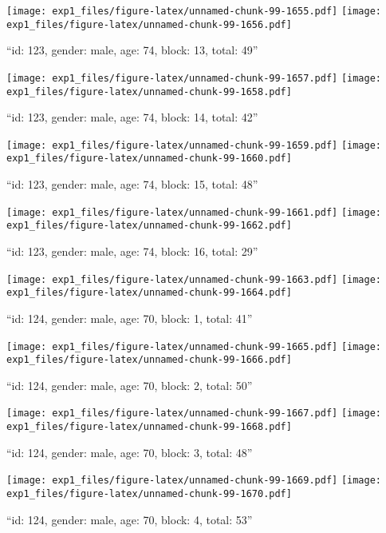 \documentclass[,]{article}
\begin{document}
\texttt{[image: exp1\_files/figure-latex/unnamed-chunk-99-1655.pdf]}
\texttt{[image: exp1\_files/figure-latex/unnamed-chunk-99-1656.pdf]}

\newpage
[1] 

``id: 123, gender: male, age: 74, block: 13, total: 49''

\texttt{[image: exp1\_files/figure-latex/unnamed-chunk-99-1657.pdf]}
\texttt{[image: exp1\_files/figure-latex/unnamed-chunk-99-1658.pdf]}

\newpage
[1] 

``id: 123, gender: male, age: 74, block: 14, total: 42''

\texttt{[image: exp1\_files/figure-latex/unnamed-chunk-99-1659.pdf]}
\texttt{[image: exp1\_files/figure-latex/unnamed-chunk-99-1660.pdf]}

\newpage
[1] 

``id: 123, gender: male, age: 74, block: 15, total: 48''

\texttt{[image: exp1\_files/figure-latex/unnamed-chunk-99-1661.pdf]}
\texttt{[image: exp1\_files/figure-latex/unnamed-chunk-99-1662.pdf]}

\newpage
[1] 

``id: 123, gender: male, age: 74, block: 16, total: 29''

\texttt{[image: exp1\_files/figure-latex/unnamed-chunk-99-1663.pdf]}
\texttt{[image: exp1\_files/figure-latex/unnamed-chunk-99-1664.pdf]}

\newpage
[1] 

``id: 124, gender: male, age: 70, block: 1, total: 41''

\texttt{[image: exp1\_files/figure-latex/unnamed-chunk-99-1665.pdf]}
\texttt{[image: exp1\_files/figure-latex/unnamed-chunk-99-1666.pdf]}

\newpage
[1] 

``id: 124, gender: male, age: 70, block: 2, total: 50''

\texttt{[image: exp1\_files/figure-latex/unnamed-chunk-99-1667.pdf]}
\texttt{[image: exp1\_files/figure-latex/unnamed-chunk-99-1668.pdf]}

\newpage
[1] 

``id: 124, gender: male, age: 70, block: 3, total: 48''

\texttt{[image: exp1\_files/figure-latex/unnamed-chunk-99-1669.pdf]}
\texttt{[image: exp1\_files/figure-latex/unnamed-chunk-99-1670.pdf]}

\newpage
[1] 

``id: 124, gender: male, age: 70, block: 4, total: 53''
\end{document}
